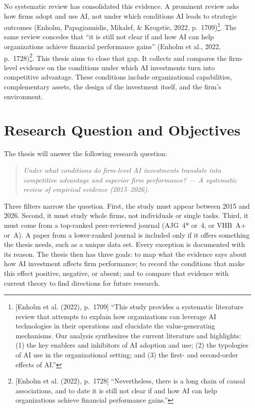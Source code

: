 \documentclass[12pt, a4paper]{article}
\begin{document}
No systematic review has consolidated this evidence. A prominent review
asks how firms adopt and use AI, not under which conditions AI leads to
strategic outcomes (Enholm, Papagiannidis, Mikalef, \& Krogstie, 2022,
p.~1709)\footnote{[Enholm et al. (2022), p.~1709] ``This study provides a systematic literature review that attempts to explain how organizations can leverage AI technologies in their operations and elucidate the value-generating mechanisms. Our analysis synthesizes the current literature and highlights: (1) the key enablers and inhibitors of AI adoption and use; (2) the typologies of AI use in the organizational setting; and (3) the first- and second-order effects of AI.''}. The same review concedes that ``it is still not
clear if and how AI can help organizations achieve financial performance
gains'' (Enholm et al., 2022, p.~1728)\footnote{[Enholm et al. (2022), p.~1728] ``Nevertheless, there is a long chain of causal associations, and to date it is still not clear if and how AI can help organizations achieve financial performance gains.''}. This thesis aims to close that gap. It collects and
compares the firm-level evidence on the conditions under which AI
investments turn into competitive advantage. These conditions include
organizational capabilities, complementary assets, the design of the
investment itself, and the firm's environment.

\section{Research Question and Objectives}

The thesis will answer the following research question:

\begin{quote}
\emph{Under what conditions do firm-level AI investments translate into
competitive advantage and superior firm performance? --- A systematic review of
empirical evidence (2015--2026).}
\end{quote}

Three filters narrow the question. First, the study must appear between 2015
and 2026. Second, it must study whole firms, not individuals or single tasks.
Third, it must come from a top-ranked peer-reviewed journal (AJG~4* or~4, or
VHB~A+ or~A). A paper from a lower-ranked journal is included only if it offers
something the thesis needs, such as a unique data set. Every exception is
documented with its reason. The thesis then has three goals: to map what the
evidence says about how AI investment affects firm performance; to record the
conditions that make this effect positive, negative, or absent; and to compare
that evidence with current theory to find directions for future research.
\end{document}
